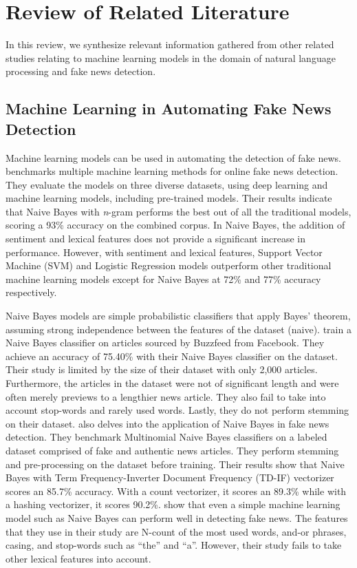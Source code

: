 \chapter{Review of Related Literature}
\label{sec:relatedlit}

In this review, we synthesize relevant information gathered from other related studies relating to machine learning models in the domain of natural language processing and fake news detection.

\section{Machine Learning in Automating Fake News Detection}

Machine learning models can be used in automating the detection of fake news.  benchmarks multiple machine learning methods for online fake news detection. They evaluate the models on three diverse datasets, using deep learning and machine learning models, including pre-trained models. Their results indicate that Naive Bayes with \textit{n}-gram performs the best out of all the traditional models, scoring a 93\% accuracy on the combined corpus. In Naive Bayes, the addition of sentiment and lexical features does not provide a significant increase in performance. However, with sentiment and lexical features, Support Vector Machine (SVM) and Logistic Regression models outperform other traditional machine learning models except for Naive Bayes at 72\% and 77\% accuracy respectively.

Naive Bayes models are simple probabilistic classifiers that apply Bayes' theorem, assuming strong independence between the features of the dataset (naive).  train a Naive Bayes classifier on articles sourced by Buzzfeed from Facebook. They achieve an accuracy of 75.40\% with their Naive Bayes classifier on the dataset. Their study is limited by the size of their dataset with only 2,000 articles. Furthermore, the articles in the dataset were not of significant length and were often merely previews to a lengthier news article. They also fail to take into account stop-words and rarely used words. Lastly, they do not perform stemming on their dataset.  also delves into the application of Naive Bayes in fake news detection. They benchmark Multinomial Naive Bayes classifiers on a labeled dataset comprised of fake and authentic news articles. They perform stemming and pre-processing on the dataset before training. Their results show that Naive Bayes with Term Frequency-Inverter Document Frequency (TD-IF) vectorizer scores an 85.7\% accuracy. With a count vectorizer, it scores an 89.3\% while with a hashing vectorizer, it scores 90.2\%.  show that even a simple machine learning model such as Naive Bayes can perform well in detecting fake news. The features that they use in their study are N-count of the most used words, and-or phrases, casing, and stop-words such as \enquote{the} and \enquote{a}. However, their study fails to take other lexical features into account.


